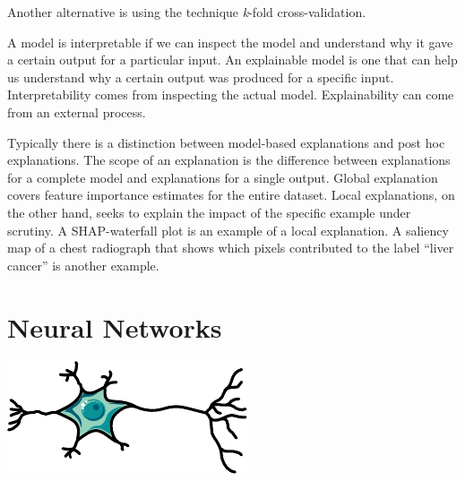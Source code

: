 Another alternative is using the technique \textit{k}-fold cross-validation.

A model is interpretable if we can inspect the model
and understand why it gave a certain output for a particular input.
An explainable model is one that can help us understand 
why a certain output was produced for a specific input.
Interpretability comes from inspecting the actual model.
Explainability can come from an external process.

Typically there is a distinction between model-based explanations
and post hoc explanations\autocite{vanderveldenExplainable2022}.
The scope of an explanation is the difference between
explanations for a complete model and
explanations for a single output.
Global explanation covers feature importance estimates 
for the entire dataset.
Local explanations, on the other hand, seeks to explain
the impact of the specific example under scrutiny.
A SHAP-waterfall plot is an example of a local explanation.
A saliency map of a chest radiograph that shows
which pixels contributed to the label \enquote{liver cancer}
is another example.


\section{Neural Networks}

\begin{marginfigure}%
	\includegraphics[width=\linewidth]{graphics/neuron}
    \caption[Schematic diagram of a neuron]{%
        Schematic diagram of a neuron.
        A typical neuron has a dendrites, a cell body, and a single axon; 
        the dendrites receive input signals from other neurons,
        and propagates output signals along the axon.
    }
    \label{fig:neuron}
\end{marginfigure}

